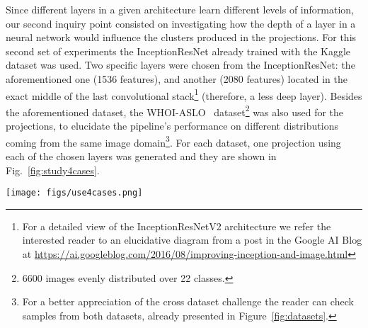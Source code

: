 \documentclass[sn-basic]{sn-jnl}%
\theoremstyle{thmstyleone}%
\theoremstyle{thmstyletwo}%
\theoremstyle{thmstylethree}%
\begin{document}
Since different layers in a given architecture learn different levels of information, our second inquiry point consisted on investigating how the depth of a layer in a neural network would influence the clusters produced in the projections. For this second set of experiments the InceptionResNet already trained with the Kaggle dataset was used. Two specific layers were chosen from the InceptionResNet: the aforementioned one (1536 features), and another (2080 features) located in the exact middle of the last convolutional stack\footnote{For a detailed view of the InceptionResNetV2 architecture we refer the interested reader to an elucidative diagram from a post in the Google AI Blog at \url{https://ai.googleblog.com/2016/08/improving-inception-and-image.html}} (therefore, a less deep layer). Besides the aforementioned dataset, the WHOI-ASLO~\citep{sosik-paper} dataset\footnote{6600 images evenly distributed over 22 classes.} was also used for the projections, to elucidate the pipeline's performance on different distributions coming from the same image domain\footnote{For a better appreciation of the cross dataset challenge the reader can check samples from both datasets, already presented in Figure~\ref{fig:datasets}.}. For each dataset, one projection using each of the chosen layers was generated and they are shown in Fig.~\ref{fig:study4cases}.



\begin{figure*}[htb]
\centerline{\texttt{[image: figs/use4cases.png]}}
\caption{An actual visual interactive labelling scenario. Top left panel shows a projection with all points in black, since the labels are not there yet. Top right panels show the actual images instead of the points, at the same positions; selections for 2 regions (in green and red), to be inspected in more detail with magnification, are also depicted. Bottom panels show zoom around the red selection (left), highlighting a dense region with fuzzy clusters, and around the green selection (right), highlighting a sparse region with clean clusters separation.}
\label{fig:use4cases}
\end{figure*}
\end{document}
